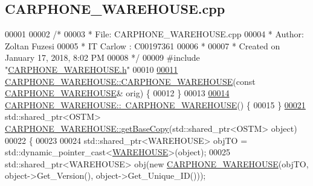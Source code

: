 \hypertarget{_c_a_r_p_h_o_n_e___w_a_r_e_h_o_u_s_e_8cpp_source}{}\subsection{C\+A\+R\+P\+H\+O\+N\+E\+\_\+\+W\+A\+R\+E\+H\+O\+U\+S\+E.\+cpp}

\begin{DoxyCode}
00001 
00002 \textcolor{comment}{/* }
00003 \textcolor{comment}{ * File:   CARPHONE\_WAREHOUSE.cpp}
00004 \textcolor{comment}{ * Author: Zoltan Fuzesi}
00005 \textcolor{comment}{ * IT Carlow : C00197361}
00006 \textcolor{comment}{ *}
00007 \textcolor{comment}{ * Created on January 17, 2018, 8:02 PM}
00008 \textcolor{comment}{ */}
00009 \textcolor{preprocessor}{#include "\hyperlink{_c_a_r_p_h_o_n_e___w_a_r_e_h_o_u_s_e_8h}{CARPHONE\_WAREHOUSE.h}"}
00010 
\hypertarget{_c_a_r_p_h_o_n_e___w_a_r_e_h_o_u_s_e_8cpp_source.tex_l00011}{}\hyperlink{class_c_a_r_p_h_o_n_e___w_a_r_e_h_o_u_s_e_a7b2446d35d557bdfaa8dbd769f845abb_a7b2446d35d557bdfaa8dbd769f845abb}{00011} \hyperlink{class_c_a_r_p_h_o_n_e___w_a_r_e_h_o_u_s_e_a0acec1e20e236b4debf1e0d26334a868_a0acec1e20e236b4debf1e0d26334a868}{CARPHONE\_WAREHOUSE::CARPHONE\_WAREHOUSE}(\textcolor{keyword}{const} 
      \hyperlink{class_c_a_r_p_h_o_n_e___w_a_r_e_h_o_u_s_e}{CARPHONE\_WAREHOUSE}& orig) \{
00012 \}
00013 
\hypertarget{_c_a_r_p_h_o_n_e___w_a_r_e_h_o_u_s_e_8cpp_source.tex_l00014}{}\hyperlink{class_c_a_r_p_h_o_n_e___w_a_r_e_h_o_u_s_e_ad125d83e519b6c7ca025a7e2b705c2a8_ad125d83e519b6c7ca025a7e2b705c2a8}{00014} \hyperlink{class_c_a_r_p_h_o_n_e___w_a_r_e_h_o_u_s_e_ad125d83e519b6c7ca025a7e2b705c2a8_ad125d83e519b6c7ca025a7e2b705c2a8}{CARPHONE\_WAREHOUSE::~CARPHONE\_WAREHOUSE}() \{
00015 \}
\hypertarget{_c_a_r_p_h_o_n_e___w_a_r_e_h_o_u_s_e_8cpp_source.tex_l00021}{}\hyperlink{class_c_a_r_p_h_o_n_e___w_a_r_e_h_o_u_s_e_a1d3b2f023c0d6e715416f1e87e7245bb_a1d3b2f023c0d6e715416f1e87e7245bb}{00021} std::shared\_ptr<OSTM> \hyperlink{class_c_a_r_p_h_o_n_e___w_a_r_e_h_o_u_s_e_a1d3b2f023c0d6e715416f1e87e7245bb_a1d3b2f023c0d6e715416f1e87e7245bb}{CARPHONE\_WAREHOUSE::getBaseCopy}(std::shared\_ptr<OSTM> \textcolor{keywordtype}{
      object})
00022 \{
00023 
00024     std::shared\_ptr<WAREHOUSE> objTO = std::dynamic\_pointer\_cast<\hyperlink{class_w_a_r_e_h_o_u_s_e}{WAREHOUSE}>(object);
00025     std::shared\_ptr<WAREHOUSE> obj(\textcolor{keyword}{new} \hyperlink{class_c_a_r_p_h_o_n_e___w_a_r_e_h_o_u_s_e_a0acec1e20e236b4debf1e0d26334a868_a0acec1e20e236b4debf1e0d26334a868}{CARPHONE\_WAREHOUSE}(objTO, object->Get\_Version(),\textcolor{keywordtype}{
      object}->Get\_Unique\_ID()));

\end{DoxyCode}

